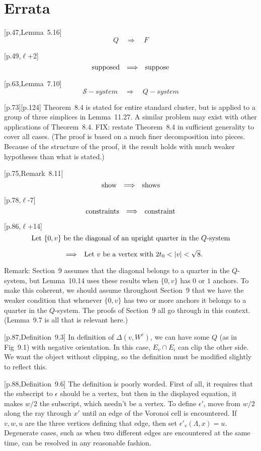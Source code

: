 \documentclass[11pt]{amsart}
\def\to{{\quad\Longrightarrow\quad}}
\def\line{$\ell$}
\def\text{\hbox}
\begin{document}
\section{Errata}

[p.47,Lemma~5.16]
	$$
	Q \to F
	$$

[p.49,\line+2]
        $$
        \text{supposed} \to \text{suppose}
        $$
        
	
[p.63,Lemma~7.10]
	$$
	{\mathcal S}-system \to Q-system
	$$
	
[p.73][p.124] Theorem~8.4 is stated for entire
standard cluster, but is applied to a group of
three simplices in Lemma~11.27.   A similar
problem may exist with other applications of
Theorem~8.4.  FIX: restate Theorem~8.4 in
sufficient generality to cover all cases.
(The proof is based on a much finer decomposition
into pieces.  Because of the structure of
the proof, it the result holds with much
weaker hypotheses than what is stated.)

[p.75,Remark~8.11]
	$$
	\text{show} \to \text{shows}
	$$

[p.78,\line-7]
      $$
      \text{constraints} \to \text{constraint}
      $$

[p.86,\line+14]
        $$
        \text{Let $\{0,v\}$ be 
          the diagonal of an upright quarter in the $Q$-system}
        $$

        $$
        \to
        \text{Let $v$ be a vertex with $2t_0<|v|<\sqrt8$.}
          $$
	
          Remark: Section~9 assumes that the diagonal belongs to
          a quarter in the $Q$-system, but Lemma~10.14 uses these
          results when $\{0,v\}$ has $0$ or $1$ anchors.  To make
          this coherent, we should assume throughout Section~9 that
          we have the weaker condition that whenever $\{0,v\}$ has
          two or more anchors it belongs to a quarter in the $Q$-system.
          The proofs of Section~9 all go through in this context.
          (Lemma~9.7 is all that is relevant here.)

[p.87,Definition~9.3]
	In definition of $\Delta(v,W^e)$, we
	can have some $Q$ (as in Fig~9.1)
	with negative orientation.
	In this case, $E_v\cap E_i$ can clip
	the other side.  We want the object
	without clipping, so the definition must
	be modified slightly to reflect this.
	
[p.88,Definition~9.6]
	The definition is poorly worded.  First of
	all, it requires that the subscript to
	$\epsilon$ should be a vertex, but then in
	the displayed equation, it makes $w/2$ the
	subscript, which needn't be a vertex.  To
	define $\epsilon'$, move from $w/2$ along
	the ray through $x'$ until an edge of the
	Voronoi cell is encountered.  If $v,w,u$
	are the three vertices defining that edge,
	then set $\epsilon'_v(\Lambda,x)=u$.
	Degenerate cases, such as when two different
	edges are encountered at the same time,
	can be resolved in any reasonable fashion.
	
\end{document}
